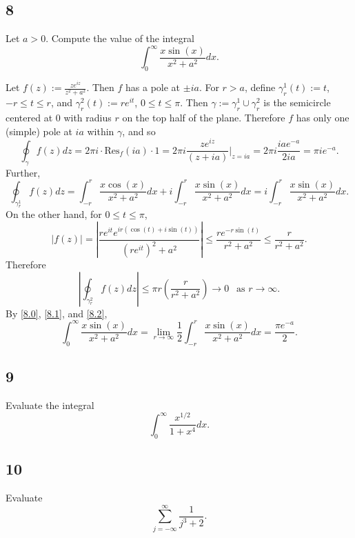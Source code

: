 \documentclass[12pt]{article}
\begin{document}
\subsection*{8}
\begin{tcolorbox}
Let $a > 0$. Compute the value of the integral 
\[ \int_{0}^{\infty}\frac{x\sin(x)}{x^2 + a^2}dx. \]
\end{tcolorbox}
Let $f(z) := \frac{ze^{iz}}{z^{2} + a^{2}}$. Then $f$ has a pole at $\pm ia$. For $r > a$, define $\gamma_{r}^{1}(t) := t$, $-r \leq t \leq r$, and
$\gamma_{r}^{2}(t) := re^{it}$, $0 \leq t \leq \pi$. Then $\gamma := \gamma_{r}^{1} \cup \gamma_{r}^{2}$ is the semicircle centered at 0 with radius
$r$ on the top half of the plane. Therefore $f$ has only one (simple) pole at $ia$ within $\gamma$, and so 
\begin{equation}
\oint_{\gamma}f(z)dz = 2\pi i \cdot \text{Res}_{f}(ia)\cdot 1 = 2\pi i \frac{ze^{iz}}{(z + ia)}\bigg|_{z=ia} = 2\pi i\frac{ia e^{-a}}{2ia} = \pi i
e^{-a}. 
\label{8.0}
\end{equation}
Further,
\begin{equation}
\oint_{\gamma_{r}^{1}}f(z)dz = \int_{-r}^{r}\frac{x\cos(x)}{x^{2} + a^{2}}dx + i \int_{-r}^{r}\frac{x\sin(x)}{x^{2} + a^{2}}dx =
i\int_{-r}^{r}\frac{x\sin(x)}{x^{2} + a^{2}}dx. 
\label{8.1}
\end{equation}
On the other hand, for $0 \leq t \leq \pi$,
\[ |f(z)| = \left|\frac{re^{it}e^{ir(\cos(t) + i\sin(t))}}{(re^{it})^{2} + a^{2}}\right| \leq \frac{re^{-r\sin(t)}}{r^{2} + a^{2}} \leq \frac{r}{r^{2}
+ a^{2}}. \]
Therefore 
\begin{equation}
\left| \oint_{\gamma_{r}^{2}}f(z)dz \right| \leq \pi r\left( \frac{r}{r^{2} + a^{2}} \right) \rightarrow 0 \ \ \text{ as } r\rightarrow \infty.
\label{8.2}
\end{equation}
By \eqref{8.0}, \eqref{8.1}, and \eqref{8.2},
\[ \int_{0}^{\infty}\frac{x\sin(x)}{x^{2} + a^{2}}dx = \lim_{r\rightarrow\infty}\frac{1}{2}\int_{-r}^{r}\frac{x\sin(x)}{x^{2} + a^{2}}dx = \frac{\pi
e^{-a}}{2}. \]

\newpage 
\subsection*{9}
\begin{tcolorbox}
Evaluate the integral 
\[ \int_{0}^{\infty}\frac{x^{1/2}}{1 + x^{4}}dx. \]
\end{tcolorbox}



\newpage 
\subsection*{10}
\begin{tcolorbox}
Evaluate 
\[ \sum_{j=-\infty}^{\infty}\frac{1}{j^{3} + 2}. \]
\end{tcolorbox}
\end{document}
